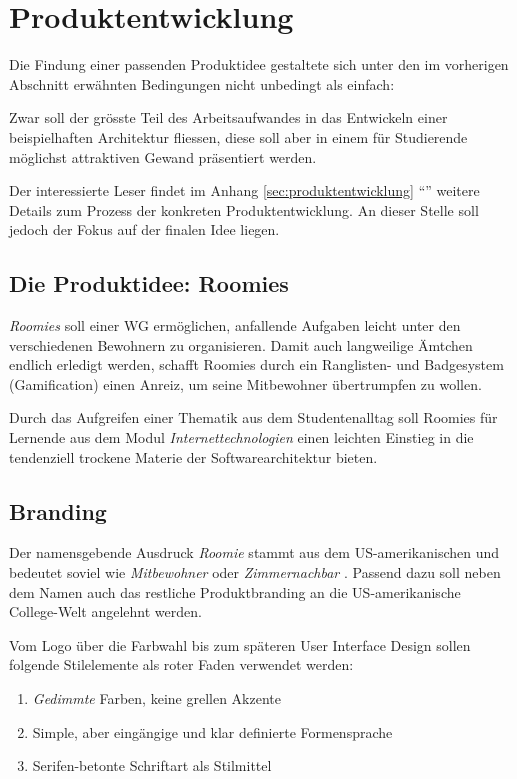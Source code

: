 \section{Produktentwicklung}
Die Findung einer passenden Produktidee gestaltete sich unter den im vorherigen Abschnitt erwähnten Bedingungen nicht unbedingt als einfach:

Zwar soll der grösste Teil des Arbeitsaufwandes in das Entwickeln einer beispielhaften Architektur fliessen, diese soll aber in einem für Studierende möglichst attraktiven Gewand präsentiert werden.

Der interessierte Leser findet im Anhang \ref{sec:produktentwicklung} ``'' weitere Details zum Prozess der konkreten Produktentwicklung. An dieser Stelle soll jedoch der Fokus auf der finalen Idee liegen.


\subsection{Die Produktidee: Roomies}
\emph{Roomies} soll einer \gls{WG} ermöglichen, anfallende Aufgaben leicht unter den verschiedenen Bewohnern zu organisieren. Damit auch langweilige Ämtchen endlich erledigt werden, schafft Roomies durch ein Ranglisten- und Badgesystem (\gls{Gamification}) einen Anreiz, um seine Mitbewohner übertrumpfen zu wollen.

Durch das Aufgreifen einer Thematik aus dem Studentenalltag soll Roomies für Lernende aus dem Modul \emph{Internettechnologien} einen leichten Einstieg in die tendenziell trockene Materie der Softwarearchitektur bieten.

\subsection{Branding}
Der namensgebende Ausdruck \emph{Roomie} stammt aus dem US-amerikanischen und bedeutet soviel wie \emph{Mitbewohner} oder \emph{Zimmernachbar} \cite{Roomie}. Passend dazu soll neben dem Namen auch das restliche Produktbranding an die US-amerikanische College-Welt angelehnt werden.

Vom Logo über die Farbwahl bis zum späteren User Interface Design sollen folgende Stilelemente als roter Faden verwendet werden:

\begin{enumerate}
	\item \emph{Gedimmte} Farben, keine grellen Akzente
	\item Simple, aber eingängige und klar definierte Formensprache
	\item Serifen-betonte Schriftart als Stilmittel
\end{enumerate}

